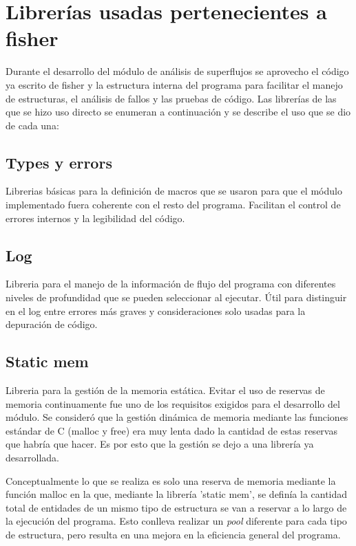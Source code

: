 \documentclass[twoside, 12pt]{epstfg}
\begin{document}
\section{Librerías usadas pertenecientes a fisher}
Durante el desarrollo del módulo de análisis de superflujos se aprovecho el código ya escrito de fisher y la estructura interna del programa para facilitar el manejo de estructuras, el análisis de fallos y las pruebas de código. Las librerías de las que se hizo uso directo se enumeran a continuación y se describe el uso que se dio de cada una:
\subsection{Types y errors}
Librerias básicas para la definición de macros que se usaron para que el módulo implementado fuera coherente con el resto del programa. Facilitan el control de errores internos y la legibilidad del código.
\subsection{Log} 
Libreria para el manejo de la información de flujo del programa con diferentes niveles de profundidad que se pueden seleccionar al ejecutar. Útil para distinguir en el log entre errores más graves y consideraciones solo usadas para la depuración de código.
\subsection{Static mem}
Libreria para la gestión de la memoria estática. Evitar el uso de reservas de memoria continuamente fue uno de los requisitos exigidos para el desarrollo del módulo. Se consideró que la gestión dinámica de memoria mediante las funciones estándar de C (malloc y free) era muy lenta dado la cantidad de estas reservas que habría que hacer. Es por esto que la gestión se dejo a una librería ya desarrollada. 

Conceptualmente lo que se realiza es solo una reserva de memoria mediante la función malloc en la que, mediante la librería 'static mem', se definía la cantidad total de entidades de un mismo tipo de estructura se van a reservar a lo largo de la ejecución del programa. Esto conlleva realizar un \textit{pool} diferente para cada tipo de estructura, pero resulta en una mejora en la eficiencia general del programa. 
\end{document}

